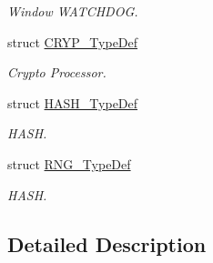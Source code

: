 \begin{DoxyCompactItemize}
\begin{DoxyCompactList}\small\item\em Window W\-A\-T\-C\-H\-D\-O\-G. \end{DoxyCompactList}\item 
struct \hyperlink{struct_c_r_y_p___type_def}{C\-R\-Y\-P\-\_\-\-Type\-Def}
\begin{DoxyCompactList}\small\item\em Crypto Processor. \end{DoxyCompactList}\item 
struct \hyperlink{struct_h_a_s_h___type_def}{H\-A\-S\-H\-\_\-\-Type\-Def}
\begin{DoxyCompactList}\small\item\em H\-A\-S\-H. \end{DoxyCompactList}\item 
struct \hyperlink{struct_r_n_g___type_def}{R\-N\-G\-\_\-\-Type\-Def}
\begin{DoxyCompactList}\small\item\em H\-A\-S\-H. \end{DoxyCompactList}\end{DoxyCompactItemize}


\subsection{Detailed Description}
